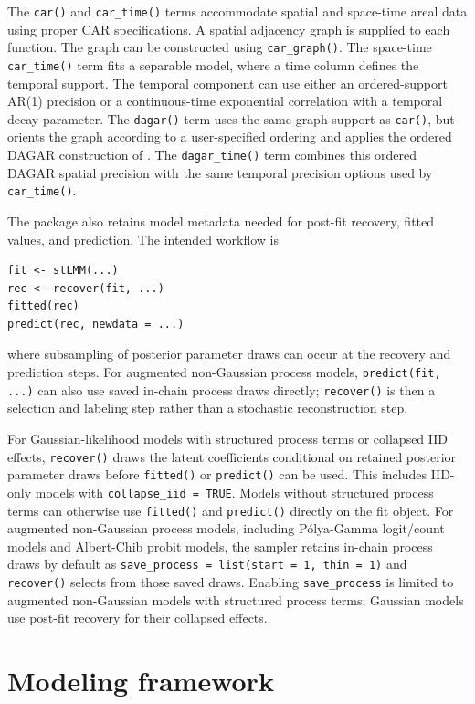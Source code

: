 \documentclass[11pt]{article}
\begin{document}
The \texttt{car()} and \texttt{car\_time()} terms accommodate spatial and space-time areal data using proper CAR specifications. A spatial adjacency graph is supplied to each function. The graph can be constructed using \texttt{car\_graph()}. The space-time \texttt{car\_time()} term fits a separable model, where a time column defines the temporal support. The temporal component can use either an ordered-support AR(1) precision or a continuous-time exponential correlation with a temporal decay parameter. The \texttt{dagar()} term uses the same graph support as \texttt{car()}, but orients the graph according to a user-specified ordering and applies the ordered DAGAR construction of \cite{DattaDAGAR2019}. The \texttt{dagar\_time()} term combines this ordered DAGAR spatial precision with the same temporal precision options used by \texttt{car\_time()}.

The package also retains model metadata needed for post-fit recovery, fitted values, and prediction. The intended workflow is
\begin{verbatim}
fit <- stLMM(...)
rec <- recover(fit, ...)
fitted(rec)
predict(rec, newdata = ...)
\end{verbatim}
where subsampling of posterior parameter draws can occur at the recovery and prediction steps. For augmented non-Gaussian process models, \texttt{predict(fit, ...)} can also use saved in-chain process draws directly; \texttt{recover()} is then a selection and labeling step rather than a stochastic reconstruction step.

For Gaussian-likelihood models with structured process terms or collapsed IID effects, \texttt{recover()} draws the latent coefficients conditional on retained posterior parameter draws before \texttt{fitted()} or \texttt{predict()} can be used. This includes IID-only models with \texttt{collapse\_iid = TRUE}. Models without structured process terms can otherwise use \texttt{fitted()} and \texttt{predict()} directly on the fit object. For augmented non-Gaussian process models, including P{\'o}lya-Gamma logit/count models and Albert-Chib probit models, the sampler retains in-chain process draws by default as \texttt{save\_process = list(start = 1, thin = 1)} and \texttt{recover()} selects from those saved draws. Enabling \texttt{save\_process} is limited to augmented non-Gaussian models with structured process terms; Gaussian models use post-fit recovery for their collapsed effects.

\section{Modeling framework}
\end{document}
